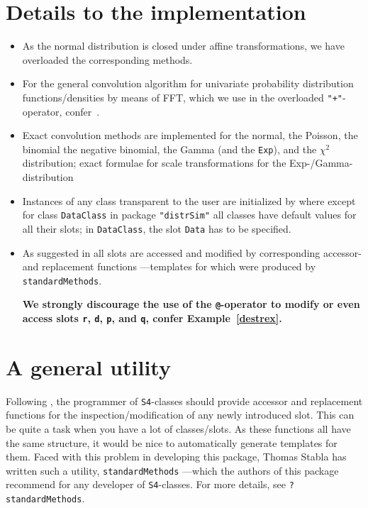 \documentclass[11pt]{article}
\newcommand{\code}[1]{{\tt #1}}
\newcommand{\pkg}[1]{{\tt "#1"}}
\begin{document}
\section{Details to the implementation}
\begin{itemize}
\item As the normal distribution is closed under affine transformations, we have overloaded the
corresponding methods. %
\item For the general convolution algorithm for univariate probability distribution functions/densities by means
of FFT, which we use in the overloaded {\tt "+"}-operator, confer~\cite{K:R:S:04}.
\item Exact convolution methods are implemented for the normal, the Poisson, the binomial
the negative binomial, the Gamma (and the \code{Exp}), and the {$\chi^2$} distribution;
exact formulae for scale transformations for the Exp-/Gamma-distribution
\item Instances of any class transparent to the user are initialized by
where except for class \code{DataClass} in package \pkg{distrSim} all classes have default values for all their slots; in \code{DataClass},
the slot \code{Data} has to be specified.
\item
As suggested in \cite{OOPGent} all slots are accessed and modified by corresponding
accessor- and replacement functions ---templates for which were produced by \code{standardMethods}.

{\bf We strongly discourage the use of the \code{@}-operator to modify
or even access slots \code{r}, \code{d}, \code{p}, and \code{q}, confer
Example~{\ref{destrex}}.}
\end{itemize}
%
\section{A general utility}
%
Following \cite{OOPGent}, the programmer of {\tt S4}-classes should provide
accessor and replacement functions for the inspection/modification of
any newly introduced slot. This can be quite a task when you have a lot of classes/slots.
As these functions all have the same structure, it would be nice
to automatically generate templates for them.
Faced with this problem in developing this package, Thomas Stabla
has written such a utility, \code{standardMethods} ---which the authors
of this package recommend for any developer of {\tt S4}-classes.
For more details, see \code{?standardMethods}.
\end{document}
